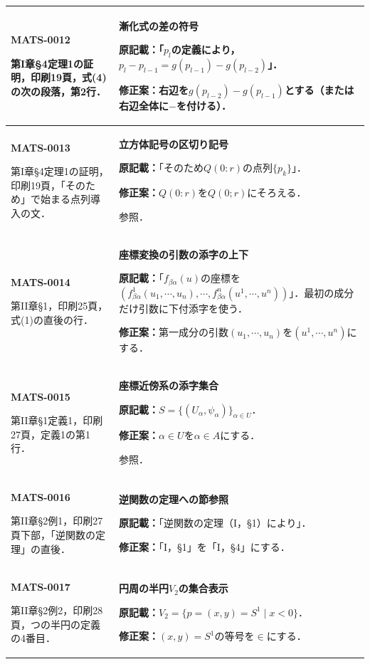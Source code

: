 \documentclass[a4paper,10pt]{ltjsarticle}
\begin{document}
\begin{longtable}{@{}>{\raggedright\arraybackslash}p{.19\linewidth}>{\raggedright\arraybackslash}p{.77\linewidth}@{}}
\hline
\hypertarget{MATS-0012}{}\textbf{MATS-0012}\par 第I章\S4定理1の証明，印刷19頁，式(4)の次の段落，第2行． & \textbf{漸化式の差の符号}\par\textbf{原記載：}「$p_l$の定義により，$p_l-p_{l-1}=g(p_{l-1})-g(p_{l-2})$」．\par\textbf{修正案：}右辺を$g(p_{l-2})-g(p_{l-1})$とする（または右辺全体に$-$を付ける）． \\[3pt]
\hline
\hypertarget{MATS-0013}{}\textbf{MATS-0013}\par 第I章\S4定理1の証明，印刷19頁，「そのため」で始まる点列導入の文． & \textbf{立方体記号の区切り記号}\par\textbf{原記載：}「そのため$Q(0:r)$の点列$\{p_k\}$」．\par\textbf{修正案：}$Q(0:r)$を$Q(0;r)$にそろえる．\par\cite{paper2017}参照． \\[3pt]
\hline
\hypertarget{MATS-0014}{}\textbf{MATS-0014}\par 第II章\S1，印刷25頁，式(1)の直後の行． & \textbf{座標変換の引数の添字の上下}\par\textbf{原記載：}「$f_{\beta\alpha}(u)$の座標を$(f_{\beta\alpha}^1(u_1,\cdots,u_n),\cdots,f_{\beta\alpha}^n(u^1,\cdots,u^n))$」．最初の成分だけ引数に下付添字を使う．\par\textbf{修正案：}第一成分の引数$(u_1,\cdots,u_n)$を$(u^1,\cdots,u^n)$にする． \\[3pt]
\hline
\hypertarget{MATS-0015}{}\textbf{MATS-0015}\par 第II章\S1定義1，印刷27頁，定義1の第1行． & \textbf{座標近傍系の添字集合}\par\textbf{原記載：}$S=\{(U_\alpha,\psi_\alpha)\}_{\alpha\in U}$．\par\textbf{修正案：}$\alpha\in U$を$\alpha\in A$にする．\par\cite{paper2017}参照． \\[3pt]
\hline
\hypertarget{MATS-0016}{}\textbf{MATS-0016}\par 第II章\S2例1，印刷27頁下部，「逆関数の定理」の直後． & \textbf{逆関数の定理への節参照}\par\textbf{原記載：}「逆関数の定理（I，\S1）により」．\par\textbf{修正案：}「I，\S1」を「I，\S4」にする． \\[3pt]
\hline
\hypertarget{MATS-0017}{}\textbf{MATS-0017}\par 第II章\S2例2，印刷28頁，つの半円の定義の4番目． & \textbf{円周の半円$V_2$の集合表示}\par\textbf{原記載：}$V_2=\{p=(x,y)=S^1\mid x<0\}$．\par\textbf{修正案：}$(x,y)=S^1$の等号を$\in$にする． \\[3pt]

\end{longtable}
\end{document}
